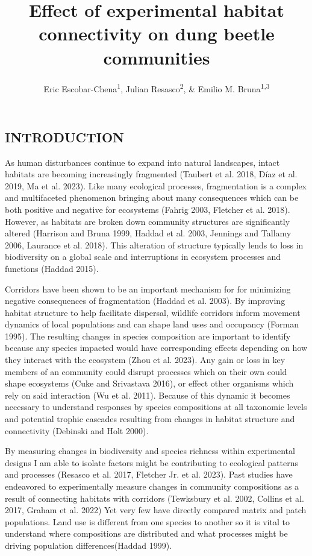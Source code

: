 \documentclass[
  man, donotrepeattitle]{apa6}
\title{Effect of experimental habitat connectivity on dung beetle communities}
\author{Eric Escobar-Chena\textsuperscript{1}, Julian Resasco\textsuperscript{2}, \& Emilio M. Bruna\textsuperscript{1,3}}
\date{}
\affiliation{\vspace{0.5cm}\textsuperscript{1} Department of Wildlife Ecology \& Conservation, University of Florida, PO Box 110530, Gainesville, Florida, 32611-0430 USA\\\textsuperscript{2} University of Colorado, Boulder\\\textsuperscript{3} Center for Latin American Studies, University of Florida, PO Box 110530, Gainesville, Florida, 32611-0530 USA}
\begin{document}
\maketitle

\subsection{INTRODUCTION}\label{introduction}

As human disturbances continue to expand into natural landscapes, intact habitats are becoming increasingly fragmented (Taubert et al. 2018, Díaz et al. 2019, Ma et al. 2023). Like many ecological processes, fragmentation is a complex and multifaceted phenomenon bringing about many consequences which can be both positive and negative for ecosystems (Fahrig 2003, Fletcher et al. 2018). However, as habitats are broken down community structures are significantly altered (Harrison and Bruna 1999, Haddad et al. 2003, Jennings and Tallamy 2006, Laurance et al. 2018). This alteration of structure typically lends to loss in biodiversity on a global scale and interruptions in ecosystem processes and functions (Haddad 2015).

Corridors have been shown to be an important mechanism for for minimizing negative consequences of fragmentation (Haddad et al. 2003). By improving habitat structure to help facilitate dispersal, wildlife corridors inform movement dynamics of local populations and can shape land uses and occupancy (Forman 1995). The resulting changes in species composition are important to identify because any species impacted would have corresponding effects depending on how they interact with the ecosystem (Zhou et al. 2023). Any gain or loss in key members of an community could disrupt processes which on their own could shape ecosystems (Cuke and Srivastava 2016), or effect other organisms which rely on said interaction (Wu et al. 2011). Because of this dynamic it becomes necessary to understand responses by species compositions at all taxonomic levels and potential trophic cascades resulting from changes in habitat structure and connectivity (Debinski and Holt 2000).

By measuring changes in biodiversity and species richness within experimental designs I am able to isolate factors might be contributing to ecological patterns and processes (Resasco et al. 2017, Fletcher Jr. et al. 2023). Past studies have endeavored to experimentally measure changes in community compositions as a result of connecting habitats with corridors (Tewksbury et al. 2002, Collins et al. 2017, Graham et al. 2022) Yet very few have directly compared matrix and patch populations. Land use is different from one species to another so it is vital to understand where compositions are distributed and what processes might be driving population differences(Haddad 1999).
\end{document}
